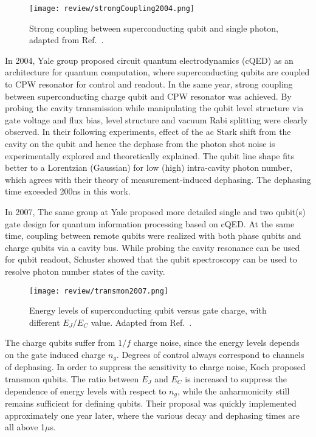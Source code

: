             \begin{figure}[h]
                \centering
                \texttt{[image: review/strongCoupling2004.png]}
                \caption{Strong coupling between superconducting qubit and single photon, adapted from Ref.~.}
                \label{fig:strongCoupling2004}
            \end{figure}

In 2004, Yale group proposed circuit quantum electrodynamics (cQED) as an architecture for quantum computation, where superconducting qubits are coupled to CPW resonator for control and readout\cite{Blais2004}. In the same year, strong coupling between superconducting charge qubit and CPW resonator was achieved\cite{Wallraff2004Nature}. By probing the cavity transmission while manipulating the qubit level structure via gate voltage and flux bias, level structure and vacuum Rabi splitting were clearly observed. In their following experiments, effect of the ac Stark shift from the cavity on the qubit and hence the dephase from the photon shot noise is experimentally explored\cite{Schuster2005} and theoretically explained\cite{Gambetta2006}. The qubit line shape fits better to a Lorentzian (Gaussian) for low (high) intra-cavity photon number, which agrees with their theory of measurement-induced dephasing. The dephasing time exceeded 200ns in this work.


In 2007, The same group at Yale proposed more detailed single and two qubit(s) gate design for quantum information processing based on cQED\cite{Blais2007}. At the same time, coupling between remote qubits were realized with both phase qubits\cite{Sillanpaa2007} and charge qubits\cite{Majer2007} via a cavity bus. While probing the cavity resonance can be used for qubit readout, Schuster \etal{} showed that the qubit spectroscopy can be used to resolve photon number states of the cavity\cite{Schuster2007Resolving}.


            \begin{figure}[h]
                \centering
                \texttt{[image: review/transmon2007.png]}
                \caption{Energy levels of superconducting qubit versus gate charge, with different $E_J/E_C$ value. Adapted from Ref.~.}
                \label{fig:transmon2007}
            \end{figure}


The charge qubits suffer from $1/f$ charge noise, since the energy levels depends on the gate induced charge $n_g$. Degrees of control always correspond to channels of dephasing. In order to suppress the sensitivity to charge noise, Koch \etal{} proposed transmon qubits\cite{koch2007charge}. The ratio between $E_J$ and $E_C$ is increased to suppress the dependence of energy levels with respect to $n_g$, while the anharmonicity still remains sufficient for defining qubits. Their proposal was quickly implemented approximately one year later\cite{Schreier2008}, where the various decay and dephasing times are all above 1$\mu$s.


